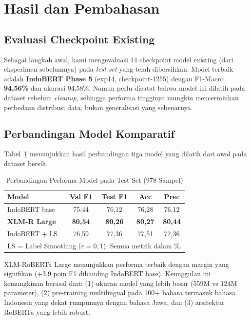 \documentclass[10pt,twocolumn]{article}
\begin{document}
\section{Hasil dan Pembahasan}

\subsection{Evaluasi Checkpoint Existing}

Sebagai langkah awal, kami mengevaluasi 14 checkpoint model existing (dari eksperimen sebelumnya) pada \textit{test set} yang telah dibersihkan. Model terbaik adalah \textbf{IndoBERT Phase 5} (exp14, checkpoint-1255) dengan F1-Macro \textbf{94,56\%} dan akurasi 94,58\%. Namun perlu dicatat bahwa model ini dilatih pada dataset sebelum \textit{cleanup}, sehingga performa tingginya mungkin mencerminkan perbedaan distribusi data, bukan generalisasi yang sebenarnya.

\subsection{Perbandingan Model Komparatif}

Tabel~\ref{tab:model_comparison} menunjukkan hasil perbandingan tiga model yang dilatih dari awal pada dataset bersih.

\begin{table}[H]
\centering
\caption{Perbandingan Performa Model pada Test Set (978 Sampel)}
\label{tab:model_comparison}
\begin{tabular}{lcccc}
\toprule
\textbf{Model} & \textbf{Val F1} & \textbf{Test F1} & \textbf{Acc} & \textbf{Prec} \\
\midrule
IndoBERT base & 75,44 & 76,12 & 76,28 & 76,12 \\
\textbf{XLM-R Large} & \textbf{80,54} & \textbf{80,26} & \textbf{80,27} & \textbf{80,44} \\
IndoBERT + LS & 76,59 & 77,36 & 77,51 & 77,36 \\
\bottomrule
\multicolumn{5}{l}{\footnotesize LS = Label Smoothing ($\varepsilon=0,1$). Semua metrik dalam \%.} \\
\end{tabular}
\end{table}

XLM-RoBERTa Large menunjukkan performa terbaik dengan margin yang signifikan (+3,9 poin F1 dibanding IndoBERT base). Keunggulan ini kemungkinan berasal dari: (1) ukuran model yang lebih besar (559M vs 124M parameter), (2) pre-training multilingual pada 100+ bahasa termasuk bahasa Indonesia yang dekat rumpunnya dengan bahasa Jawa, dan (3) arsitektur RoBERTa yang lebih robust.
\end{document}
